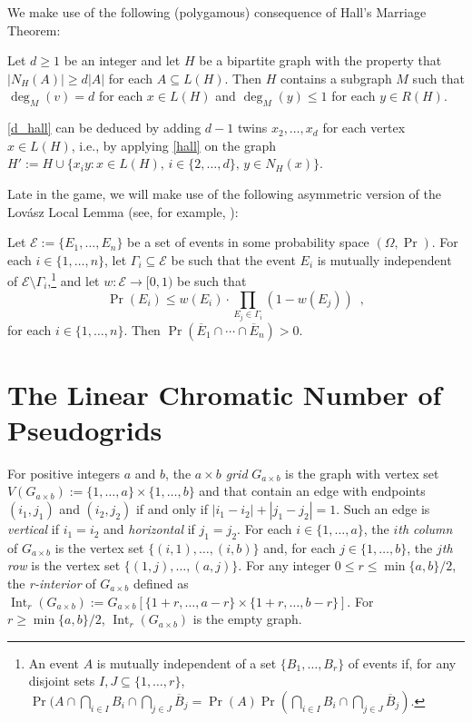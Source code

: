 \documentclass{patmorin}
\DeclareMathOperator{\interior}{Int}
\newcommand{\defin}[1]{\emph{\color{brightmaroon}#1}}
\begin{document}
We make use of the following (polygamous) consequence of Hall's Marriage Theorem:
\begin{cor}\label{d_hall}
  Let $d\ge 1$ be an integer and let $H$ be a bipartite graph with the property that $|N_H(A)|\ge d|A|$ for each $A\subseteq L(H)$.  Then $H$ contains a subgraph $M$ such that $\deg_M(v)=d$ for each $x\in L(H)$ and $\deg_M(y)\le 1$ for each $y\in R(H)$.
\end{cor}

\cref{d_hall} can be deduced by adding $d-1$ twins $x_2,\ldots,x_d$ for each vertex $x\in L(H)$, i.e., by applying \cref{hall} on the graph $H':=H\cup\{x_iy:x\in L(H),\, i\in\{2,\ldots,d\},\, y\in N_H(x)\}$.


Late in the game, we will make use of the following asymmetric version of the Lovász Local Lemma (see, for example, \citet[Lemma~5.1.1]{alon.spencer:probabilistic}):

\begin{lem}\label{weighted_lovasz}
  Let $\mathcal{E}:=\{E_1,\ldots,E_n\}$ be a set of events in some probability space $(\Omega,\Pr)$.  For each $i\in\{1,\ldots,n\}$, let $\Gamma_i\subseteq \mathcal{E}$ be such that the event $E_i$ is mutually independent of $\mathcal{E}\setminus \Gamma_i$,\footnote{An event $A$ is mutually independent of a set $\{B_1,\ldots,B_r\}$ of events if, for any disjoint sets $I,J\subseteq\{1,\ldots,r\}$, $\Pr(A\cap\bigcap_{i\in I} B_i\cap\bigcap_{j\in J} \overline{B}_j=\Pr(A)\Pr(\bigcap_{i\in I} B_i\cap\bigcap_{j\in J} \overline{B}_j)$.} and let $w:\mathcal{E}\to[0,1)$ be such that
  \[
      \Pr(E_i) \le w(E_i)\cdot\prod_{E_j\in\Gamma_i}(1-w(E_j))  \enspace ,
  \]
  for each $i\in\{1,\ldots,n\}$.
  Then $\Pr(\overline{E}_1\cap\cdots\cap\overline{E}_n) > 0$.
\end{lem}


\section{The Linear Chromatic Number of Pseudogrids}

For positive integers $a$ and $b$, the \defin{$a\times b$ grid} $G_{a\times b}$ is the graph with vertex set $V(G_{a\times b}):=\{1,\ldots,a\}\times\{1,\ldots,b\}$ and that contain an edge with endpoints $(i_1,j_1)$ and $(i_2,j_2)$ if and only if $|i_1-i_2|+|j_1-j_2|=1$.  Such an edge is \defin{vertical} if $i_1=i_2$ and \defin{horizontal} if $j_1=j_2$.  For each $i\in\{1,\ldots,a\}$, the \defin{$i$th column} of $G_{a\times b}$ is the vertex set $\{(i,1),\ldots,(i,b)\}$ and, for each $j\in\{1,\ldots,b\}$, the \defin{$j$th row} is the vertex set $\{(1,j),\ldots,(a,j)\}$.  For any integer $0\le r\le\min\{a,b\}/2$, the \defin{r-interior} of $G_{a\times b}$ defined as $\interior_r(G_{a\times b}):=G_{a\times b}[\{1+r,\ldots,a-r\}\times\{1+r,\ldots,b-r\}]$.  For $r\ge\min\{a,b\}/2$, $\interior_r(G_{a\times b})$ is the empty graph.
\end{document}
